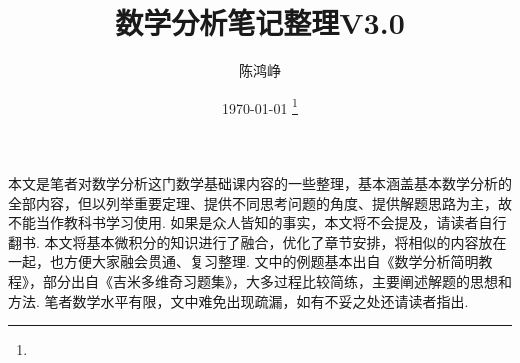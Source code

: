 \documentclass[11pt,UTF8]{ctexart}
\title{数学分析笔记整理V3.0}
\author{陈鸿峥}
\date{{\builddatemonth\today} \footnote{\text{Build \builddate\today}}}%
\renewcommand{\thefootnote}{\fnsymbol{footnote}}
\begin{document}
\maketitle
\renewcommand{\thefootnote}{\arabic{footnote}}
\setcounter{footnote}{0}

\setcounter{tocdepth}{2}%
\tableofcontents
\bigskip\bigskip\bigskip

\par 本文是笔者对数学分析这门数学基础课内容的一些整理，基本涵盖基本数学分析的全部内容，但以列举重要定理、提供不同思考问题的角度、提供解题思路为主，故不能当作教科书学习使用. 如果是众人皆知的事实，本文将不会提及，请读者自行翻书. 本文将基本微积分的知识进行了融合，优化了章节安排，将相似的内容放在一起，也方便大家融会贯通、复习整理. 文中的例题基本出自《数学分析简明教程》，部分出自《吉米多维奇习题集》，大多过程比较简练，主要阐述解题的思想和方法. 笔者数学水平有限，文中难免出现疏漏，如有不妥之处还请读者指出.













\end{document}

